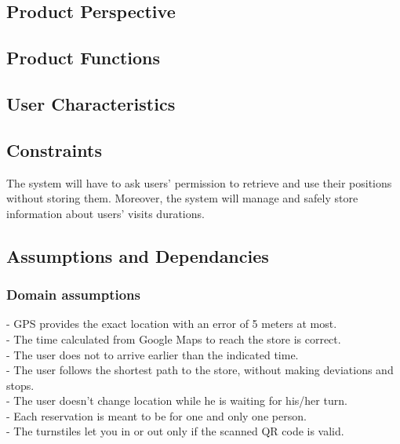 \documentclass{article}
\begin{document}
\subsection{Product Perspective}
\subsection{Product Functions}
\subsection{User Characteristics}
\subsection{Constraints}
The system will have to ask users' permission to retrieve and use their positions without storing them. Moreover, the system will manage and safely store information about users' visits durations.\\
\subsection{Assumptions and Dependancies}
\subsubsection{Domain assumptions}
\noindent\medskip
[D1] - GPS provides the exact location with an error of 5 meters at most.\\
\noindent\medskip
[D2] - The time calculated from Google Maps to reach the store is correct.\\
\noindent\medskip
[D3] - The user does not to arrive earlier than the indicated time.\\
\noindent\medskip
[D4] - The user follows the shortest path to the store, without making deviations and stops.\\
\noindent\medskip
[D5] - The user doesn’t change location while he is waiting for his/her turn.\\
\noindent\medskip
[D6] - Each reservation is meant to be for one and only one person.\\
\noindent\medskip
[D7] - The turnstiles let you in or out only if the scanned QR code is valid.\\
\end{document}
